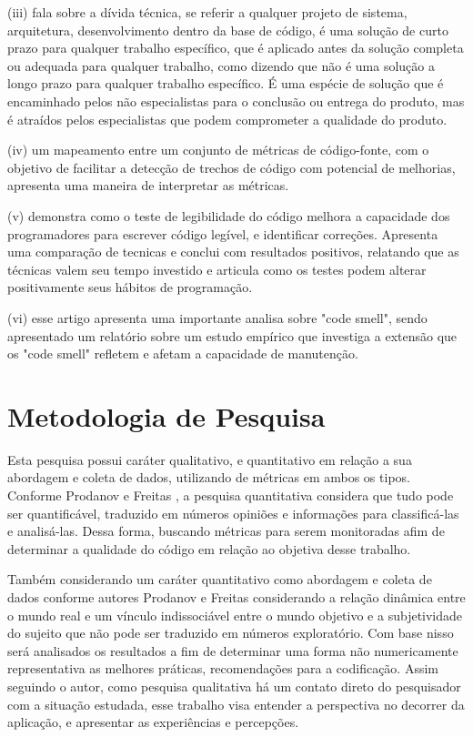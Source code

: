 \documentclass[12pt]{article}
\begin{document}
 (iii) \cite{TR_QC_TECHNICAL_DEBT} fala sobre a dívida técnica, se referir a qualquer projeto de sistema, arquitetura, desenvolvimento dentro da base de código, é uma solução de curto prazo para qualquer trabalho específico, que é aplicado antes da solução completa ou adequada para
qualquer trabalho, como dizendo que não é uma solução a longo prazo para qualquer trabalho específico. É uma espécie de solução que é encaminhado pelos não especialistas para o conclusão ou entrega do produto, mas é atraídos pelos especialistas que podem comprometer a qualidade do produto.

 (iv) \cite{TR_CLEAN_CODE_METRICA} um mapeamento entre um conjunto de métricas de código-fonte, com o objetivo de facilitar a detecção de trechos de código com potencial de melhorias, apresenta uma maneira de interpretar as métricas.

 (v) \cite{CODE_READABILITY_TESTING_STUDY} demonstra
como o teste de legibilidade do código melhora a capacidade dos programadores
para escrever código legível, e identificar correções. Apresenta uma comparação de tecnicas e conclui com resultados positivos, relatando que as técnicas valem seu tempo investido e articula como os testes podem alterar positivamente seus hábitos de programação.
 
 (vi) \cite{CODE_SMELLS_REFLECT_IMPORTANT_MAINTAINABILITY_ASPECTS} esse artigo apresenta uma importante analisa sobre "code smell", sendo apresentado um relatório sobre um estudo empírico que investiga a extensão que os "code smell" refletem e afetam a capacidade de manutenção.

\part{Metodologia de Pesquisa} \label{sec:metodologia_Pesquisa}

Esta pesquisa possui caráter qualitativo, e quantitativo em relação a sua abordagem e coleta de dados, utilizando de métricas em ambos os tipos. Conforme Prodanov e Freitas \cite{METOLOGIA}, a pesquisa quantitativa  considera que tudo pode ser quantificável, traduzido em números opiniões e informações para classificá-las e analisá-las. Dessa forma, buscando métricas para serem monitoradas afim de determinar a qualidade do código em relação ao objetiva desse trabalho.

Também considerando um caráter quantitativo como abordagem e coleta de dados conforme autores Prodanov e Freitas \cite{METOLOGIA} considerando a relação dinâmica entre o mundo real e um  vínculo  indissociável  entre  o  mundo  objetivo e  a  subjetividade  do  sujeito  que  não  pode  ser  traduzido  em  números
exploratório. Com base nisso será analisados os resultados a fim de determinar uma forma não numericamente representativa as melhores práticas, recomendações para a codificação. Assim seguindo o autor, como pesquisa qualitativa há um contato direto do pesquisador com a situação estudada, esse trabalho visa entender a perspectiva no decorrer da aplicação, e apresentar as experiências e percepções.
\end{document}
